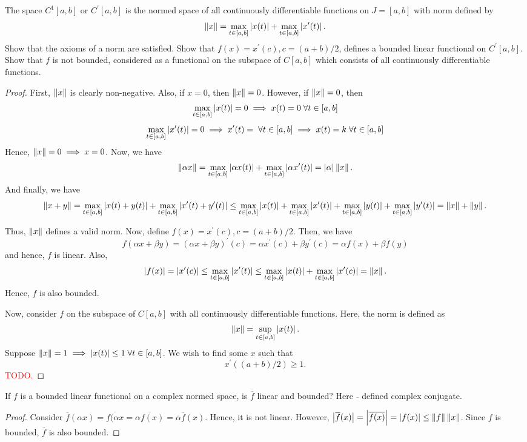 \begin{question}
    The space $C^1[a,b]$ or $C^\prime[a,b]$ is the normed space of all continuously differentiable functions on $J = [a,b]$ with norm defined by
    \[\left\lVert x \right\rVert = \max_{t \in [a,b]} \left\lvert x(t) \right\rvert + \max_{t \in [a,b]} \left\lvert x^\prime(t) \right\rvert.\]
    Show that the axioms of a norm are satisfied. Show that $f(x) = x^\prime (c), c = (a+b)/2$, defines a bounded linear functional on $C^\prime[a,b]$. Show that $f$ is not bounded, considered as a functional on the subspace of $C[a,b]$ which consists of all continuously differentiable functions.
    \label{section2.8-6}
\end{question}
\begin{proof}
    First, $\left\lVert x \right\rVert$ is clearly non-negative. Also, if $x = 0$, then $\left\lVert x \right\rVert = 0$. However, if $\left\lVert x \right\rVert = 0$, then 
    \[\max_{t \in [a,b]} \left\lvert x(t) \right\rvert = 0 \implies x(t) = 0 \; \forall t \in [a,b]\]
    \[\max_{t \in [a,b]} \left\lvert x^\prime(t) \right\rvert = 0 \implies x^\prime(t) = \;\forall t\in [a,b] \implies x(t) = k \;\forall t \in [a,b]\]
    Hence, $\left\lVert x \right\rVert = 0 \implies x = 0$.
    Now, we have
    \[\left\lVert \alpha x \right\rVert = \max_{t \in [a,b]}\left\lvert \alpha x(t) \right\rvert + \max_{t \in [a,b]} \left\lvert \alpha x^\prime (t) \right\rvert = \left\lvert \alpha \right\rvert \left\lVert x \right\rVert.\]
    And finally, we have
    \[\left\lVert x + y \right\rVert = \max_{t \in [a,b]} \left\lvert x(t) + y(t) \right\rvert + \max_{t \in [a,b]} \left\lvert x^\prime(t) + y^\prime (t) \right\rvert \leq \max_{t \in [a,b]} \left\lvert x(t) \right\rvert + \max_{t\in [a,b]} \left\lvert x^\prime(t) \right\rvert + \max_{t \in [a,b]} \left\lvert y(t) \right\rvert + \max_{t \in [a,b]} \left\lvert y^\prime(t) \right\rvert = \left\lVert x \right\rVert + \left\lVert y \right\rVert.\]

    Thus, $\left\lVert x \right\rVert$ defines a valid norm. Now, define $f(x) = x^\prime(c) , c = (a+b)/2$. Then, we have
    \[f(\alpha x + \beta y) = (\alpha x + \beta y)^\prime(c) = \alpha x^\prime(c) + \beta y^\prime(c) = \alpha f(x) + \beta f(y)\]
    and hence, $f$ is linear. Also, 
    \[\left\lvert f(x) \right\rvert = \left\lvert x^\prime(c) \right\rvert \leq \max_{t \in [a,b]} \left\lvert x^\prime(t) \right\rvert \leq \max_{t \in [a,b]} \left\lvert x(t) \right\rvert + \max_{t \in [a,b]} \left\lvert x^\prime(c) \right\rvert = \left\lVert x \right\rVert.\]
    Hence, $f$ is also bounded.

    Now, consider $f$ on the subspace of $C[a,b]$ with all continuously differentiable functions. Here, the norm is defined as 
    \[\left\lVert x \right\rVert = \sup_{t \in [a,b]} \left\lvert x(t) \right\rvert.\]
    Suppose $\left\lVert x \right\rVert = 1 \implies \left\lvert x(t) \right\rvert \leq 1 \;\forall t \in [a,b]$. We wish to find some $x$ such that 
    \[x^\prime((a+b)/2)\geq 1.\]
    \textcolor{red}{TODO.}
\end{proof}

\begin{question}
    If $f$ is a bounded linear functional on a complex normed space, is $\overline{f}$ linear and bounded? Here $\overline{}$ defined complex conjugate.
    \label{section2.8-7}
\end{question}
\begin{proof}
    Consider $\overline{f}(\alpha x) = \overline{f(\alpha x} = \overline{\alpha f(x)} = \overline{\alpha} \overline{f}(x).$ Hence, it is not linear. However, $\left\lvert \overline{f}(x) \right\rvert = \left\lvert \overline{f(x)} \right\rvert = \left\lvert f(x) \right\rvert \leq \left\lVert f \right\rVert\left\lVert x \right\rVert$. Since $f$ is bounded, $\overline{f}$ is also bounded.
\end{proof}

